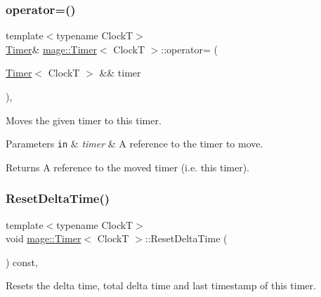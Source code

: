 \subsubsection{\texorpdfstring{operator=()}{operator=()}\hspace{0.1cm}{\footnotesize\ttfamily [2/2]}}
{\footnotesize\ttfamily template$<$typename ClockT$>$ \\
\hyperlink{classmage_1_1_timer}{Timer}\& \hyperlink{classmage_1_1_timer}{mage\+::\+Timer}$<$ ClockT $>$\+::operator= (\begin{DoxyParamCaption}\item[{\hyperlink{classmage_1_1_timer}{Timer}$<$ ClockT $>$ \&\&}]{timer }\end{DoxyParamCaption})\hspace{0.3cm}{\ttfamily [default]}, {\ttfamily [noexcept]}}

Moves the given timer to this timer.


\begin{DoxyParams}[1]{Parameters}
\mbox{\tt in}  & {\em timer} & A reference to the timer to move. \\
\hline
\end{DoxyParams}
\begin{DoxyReturn}{Returns}
A reference to the moved timer (i.\+e. this timer). 
\end{DoxyReturn}
\hypertarget{classmage_1_1_timer_ac39577316a032bce5b009401d67d406b}{}\label{classmage_1_1_timer_ac39577316a032bce5b009401d67d406b} 
\subsubsection{\texorpdfstring{Reset\+Delta\+Time()}{ResetDeltaTime()}}
{\footnotesize\ttfamily template$<$typename ClockT$>$ \\
void \hyperlink{classmage_1_1_timer}{mage\+::\+Timer}$<$ ClockT $>$\+::Reset\+Delta\+Time (\begin{DoxyParamCaption}{ }\end{DoxyParamCaption}) const\hspace{0.3cm}{\ttfamily [private]}, {\ttfamily [noexcept]}}

Resets the delta time, total delta time and last timestamp of this timer. \hypertarget{classmage_1_1_timer_a54dab2d77f8beca30d52e8497e466988}{}\label{classmage_1_1_timer_a54dab2d77f8beca30d52e8497e466988} 
